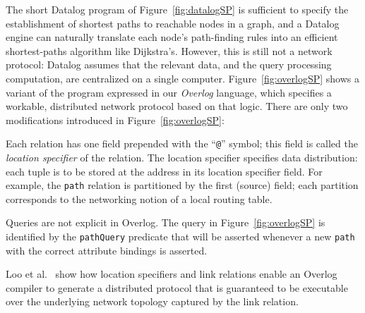 The short Datalog program of Figure~\ref{fig:datalogSP} is sufficient
to specify the establishment of shortest paths to reachable nodes in a graph, 
and a Datalog engine can naturally translate each
node's path-finding rules into an efficient shortest-paths algorithm
like Dijkstra's.  However, this is still not a network protocol:
Datalog assumes that the relevant data, and the query processing
computation, are centralized on a single computer.
Figure~\ref{fig:overlogSP} shows a variant of the program expressed in
our {\em Overlog} language, which specifies a workable,
distributed network protocol based on that logic.  There are only two
modifications introduced in Figure~\ref{fig:overlogSP}:
\begin{CompactEnumerate}
\item Each relation has one field prepended with
   the ``{\tt @}'' symbol; this field is called the {\em location specifier}
of the relation.  The location specifier specifies data distribution:
each tuple is to be stored at the address in its location
specifier field.  For example, the {\tt path} relation is partitioned
by the first (source) field; each partition corresponds to the
networking notion of a local routing table.
\item Queries are not explicit in Overlog. The query in Figure~\ref{fig:overlogSP}
         is identified by the {\tt pathQuery} predicate that will be asserted whenever
         a new {\tt path} with the correct attribute bindings is asserted.
\end{CompactEnumerate}
Loo et al.~\cite{loo-sigmod06} show how location specifiers and link
relations enable an Overlog compiler to generate a distributed
protocol that is guaranteed to be executable over the
underlying network topology captured by the link relation.
